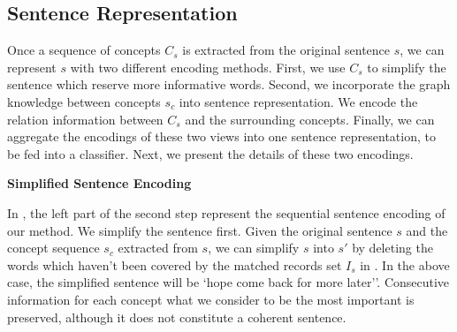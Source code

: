
\subsection{Sentence Representation}
\label{sec:represent}
Once a sequence of concepts $C_s$ is extracted from
the original sentence $s$, we can represent $s$ with two different 
encoding methods. First, we use $C_s$ to simplify the sentence which reserve 
more informative words.
Second, we incorporate the graph knowledge between concepts $s_c$ 
into sentence representation. We encode the relation information between 
$C_s$ and the surrounding concepts.
Finally, we can aggregate the encodings of these two views
into one sentence representation, to be fed into a classifier.
Next, we present the details of these two encodings.

\textbf{Simplified Sentence Encoding}

 In , the left part of the second step represent the sequential sentence encoding 
 of our method. We simplify the sentence first.
 Given the original sentence $s$ and the concept sequence $s_c$ extracted
from $s$, 
we can simplify $s$ into $s'$ by deleting the words which 
haven't been covered by the matched records set $I_s$ in .
In the above case, the simplified sentence will be 
`hope come back for more later''.
Consecutive information for each concept what we 
consider to be the most important is preserved, 
although it does not constitute a coherent sentence.

